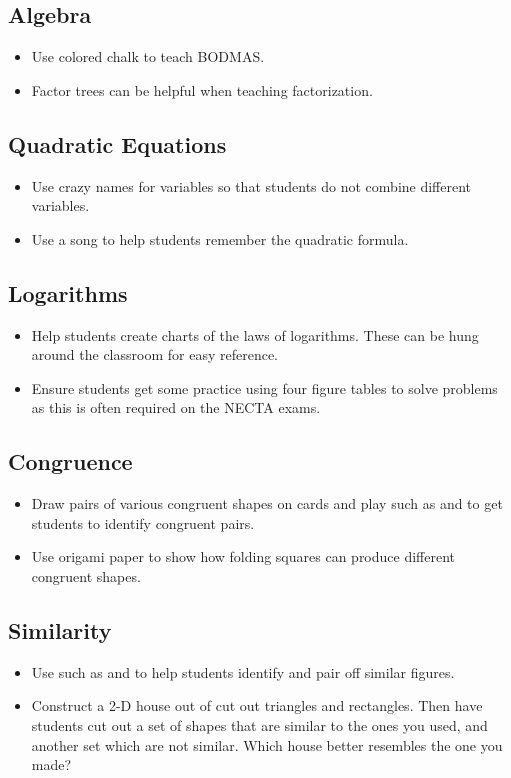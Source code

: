 	\subsection{Algebra}
	\begin{itemize}
	\item Use colored chalk to teach BODMAS.
	\item Factor trees can be helpful when teaching factorization.
	\end{itemize}
	
	\subsection{Quadratic Equations}
	\begin{itemize}
	\item Use crazy names for variables so that students do not combine different variables.
	\item Use a song to help students remember the quadratic formula.
	\end{itemize}
	
	\subsection{Logarithms}
	\begin{itemize}
	\item Help students create charts of the laws of logarithms. These can be hung around the classroom for easy reference.
	\item Ensure students get some practice using four figure tables to solve problems as this is often required on the NECTA exams.
	\end{itemize}
	
	\subsection{Congruence} \label{congruence}
	\begin{itemize}
	\item Draw pairs of various congruent shapes on cards and play  such as  and  to get students to identify congruent pairs.
	\item Use origami paper to show how folding squares can produce different congruent shapes.
	\end{itemize}
	
	\subsection{Similarity} \label{similarity}
	\begin{itemize}
	\item Use  such as  and  to help students identify and pair off similar figures.
	\item Construct a 2-D house out of cut out triangles and rectangles. Then have students cut out a set of shapes that are similar to the ones you used, and another set which are not similar. Which house better resembles the one you made?
	\end{itemize}
	
